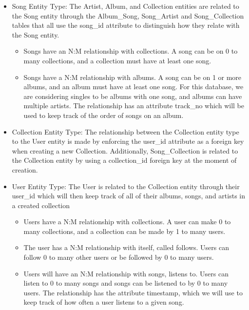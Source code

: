 \documentclass[12pt]{article}
\begin{document}
\begin{itemize}
\begin{itemize}
            \end{itemize}
                \item Song Entity Type: The Artist, Album, and Collection entities are related to the Song entity through the Album\_Song, Song\_Artist and Song\_Collection tables that all use the song\_id attribute to distinguish how they relate with the Song entity.
            \begin{itemize}
                \item Songs have an N:M relationship with collections. A song can be on 0 to many collections, and a collection must have at least one song.
                \item Songs have a N:M relationship with albums. A song can be on 1 or more albums, and an album must have at least one song. For this database, we are considering singles to be albums with one song, and albums can have multiple artists. The relationship has an attribute \“track\_no\” which will be used to keep track of the order of songs on an album.
            \end{itemize}
                \item Collection Entity Type: The relationship between the Collection entity type to the User entity is made by enforcing the user\_id attribute as a foreign key when creating a new Collection. Additionally, Song\_Collection is related to the Collection entity by using a collection\_id foreign key at the moment of creation.
        \item User Entity Type: The User is related to the Collection entity through their user\_id which will then keep track of all of their albums, songs, and artists in a created collection
            \begin{itemize}
                \item Users have a N:M relationship with collections. A user can make 0 to many collections, and a collection can be made by 1 to many users.
                \item The user has a N:M relationship with itself, called \“follows.\” Users can follow 0 to many other users or be followed by 0 to many users.
                \item Users will have an N:M relationship with songs, \“listens to.\” Users can listen to 0 to many songs and songs can be listened to by 0 to many users. The relationship has the attribute \“timestamp,\” which we will use to keep track of how often a user listens to a given song.
            \end{itemize}
    \end{itemize}
%
%
%
%
\end{document}
